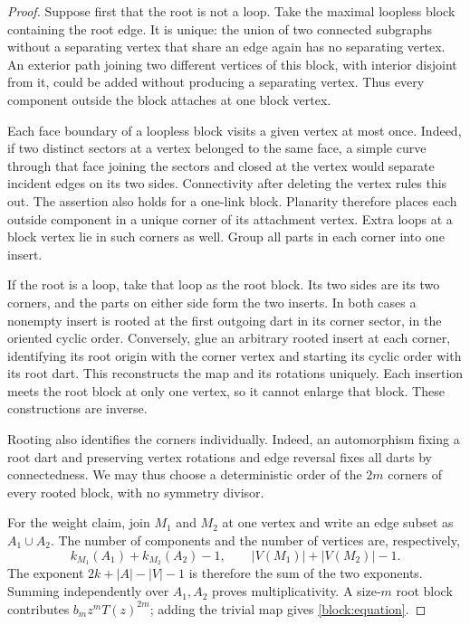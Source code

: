 \begin{proof}
Suppose first that the root is not a loop. Take the maximal loopless
block containing the root edge. It is unique: the union of two
connected subgraphs without a separating vertex that share an edge
again has no separating vertex. An exterior path joining two different
vertices of this block, with interior disjoint from it, could be added
without producing a separating vertex. Thus every component outside the
block attaches at one block vertex.

Each face boundary of a loopless block visits a given vertex at most
once. Indeed, if two distinct sectors at a vertex belonged to the same
face, a simple curve through that face joining the sectors and closed
at the vertex would separate incident edges on its two sides.
Connectivity after deleting the vertex rules this out. The assertion
also holds for a one-link block. Planarity therefore places each
outside component in a unique corner of its attachment vertex.
Extra loops at a block vertex lie in such corners as well. Group all
parts in each corner into one insert.

If the root is a loop, take that loop as the root block. Its two sides
are its two corners, and the parts on either side form the two inserts.
In both cases a nonempty insert is rooted at the first outgoing dart
in its corner sector, in the oriented cyclic order. Conversely, glue
an arbitrary rooted insert at each corner, identifying its root origin
with the corner vertex and starting its cyclic order with its root dart.
This reconstructs the map and its rotations uniquely. Each insertion
meets the root block at only one vertex, so it cannot enlarge that
block. These constructions are inverse.

Rooting also identifies the corners individually. Indeed, an
automorphism fixing a root dart and preserving vertex rotations and
edge reversal fixes all darts by connectedness. We may thus choose a
deterministic order of the $2m$ corners of every rooted block, with no
symmetry divisor.

For the weight claim, join $M_1$ and $M_2$ at one vertex and write an
edge subset as $A_1\cup A_2$. The number of components and the number
of vertices are, respectively,
\[
 k_{M_1}(A_1)+k_{M_2}(A_2)-1,\qquad
 |V(M_1)|+|V(M_2)|-1.
\]
The exponent $2k+|A|-|V|-1$ is therefore the sum of the two exponents.
Summing independently over $A_1,A_2$ proves multiplicativity.
A size-$m$ root block contributes $b_mz^mT(z)^{2m}$; adding the
trivial map gives \eqref{block:equation}.
\end{proof}

